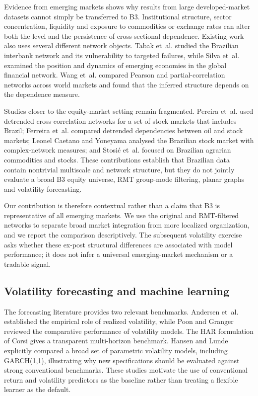 Evidence from emerging markets shows why results from large developed-market datasets cannot simply be transferred to B3. Institutional structure, sector concentration, liquidity and exposure to commodities or exchange rates can alter both the level and the persistence of cross-sectional dependence. Existing work also uses several different network objects. Tabak et~al. \cite{tabak_2010_topology} studied the Brazilian interbank network and its vulnerability to targeted failures, while Silva et~al. \cite{silva_2016_structure} examined the position and dynamics of emerging economies in the global financial network. Wang et~al. \cite{wang_2018_correlation} compared Pearson and partial-correlation networks across world markets and found that the inferred structure depends on the dependence measure.

Studies closer to the equity-market setting remain fragmented. Pereira et~al. \cite{pereira_2019_multiscale} used detrended cross-correlation networks for a set of stock markets that includes Brazil; Ferreira et~al. \cite{ferreira_2019_detrended} compared detrended dependencies between oil and stock markets; Leonel Caetano and Yoneyama \cite{leonel_2022_brazilian} analysed the Brazilian stock market with complex-network measures; and Stosi{\'c} et~al. \cite{stosic_2015_correlations} focused on Brazilian agrarian commodities and stocks. These contributions establish that Brazilian data contain nontrivial multiscale and network structure, but they do not jointly evaluate a broad B3 equity universe, RMT group-mode filtering, planar graphs and volatility forecasting.

Our contribution is therefore contextual rather than a claim that B3 is representative of all emerging markets. We use the original and RMT-filtered networks to separate broad market integration from more localized organization, and we report the comparison descriptively. The subsequent volatility exercise asks whether these ex-post structural differences are associated with model performance; it does not infer a universal emerging-market mechanism or a tradable signal.

\subsection{Volatility forecasting and machine learning}

The forecasting literature provides two relevant benchmarks. Andersen et~al. \cite{andersen_2003_modeling} established the empirical role of realized volatility, while Poon and Granger \cite{poon_granger_2003} reviewed the comparative performance of volatility models. The HAR formulation of Corsi \cite{corsi_2009_simple} gives a transparent multi-horizon benchmark. Hansen and Lunde \cite{hansen_lunde_2005} explicitly compared a broad set of parametric volatility models, including GARCH(1,1), illustrating why new specifications should be evaluated against strong conventional benchmarks. These studies motivate the use of conventional return and volatility predictors as the baseline rather than treating a flexible learner as the default.

